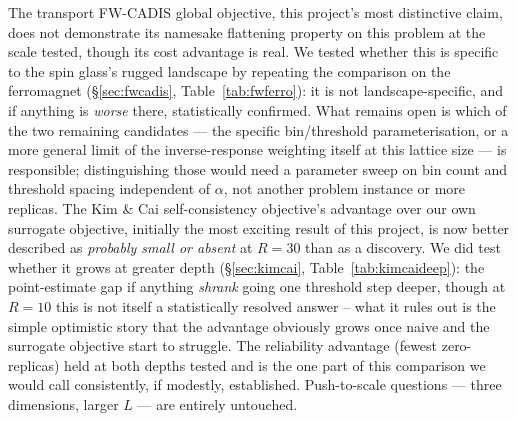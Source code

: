 \documentclass[a4paper,fleqn]{cas-sc}
\begin{document}
The transport FW-CADIS global objective, this project's most distinctive claim, does not demonstrate its
namesake flattening property on this problem at the scale tested, though its cost advantage
is real. We tested whether this is specific to the spin glass's rugged landscape by
repeating the comparison on the ferromagnet (\S\ref{sec:fwcadis}, Table~\ref{tab:fwferro}):
it is not landscape-specific, and if anything is \emph{worse} there, statistically
confirmed. What remains open is which of the two remaining candidates --- the specific
bin/threshold parameterisation, or a more general limit of the inverse-response weighting
itself at this lattice size --- is responsible; distinguishing those would need a
parameter sweep on bin count and threshold spacing independent of $\alpha$, not another
problem instance or more replicas. The Kim \& Cai self-consistency objective's advantage
over our own surrogate
objective, initially the most exciting result of this project, is now better described as
\emph{probably small or absent} at $R=30$ than as a discovery. We did test whether it grows
at greater depth (\S\ref{sec:kimcai}, Table~\ref{tab:kimcaideep}): the point-estimate gap
if anything \emph{shrank} going one threshold step deeper, though at $R=10$ this is not
itself a statistically resolved answer -- what it rules out is the simple optimistic story
that the advantage obviously grows once naive and the surrogate objective start to
struggle. The reliability advantage (fewest zero-replicas) held at both depths tested and
is the one part of this comparison we would call consistently, if modestly, established.
Push-to-scale questions --- three dimensions, larger $L$ --- are entirely untouched.
\end{document}
